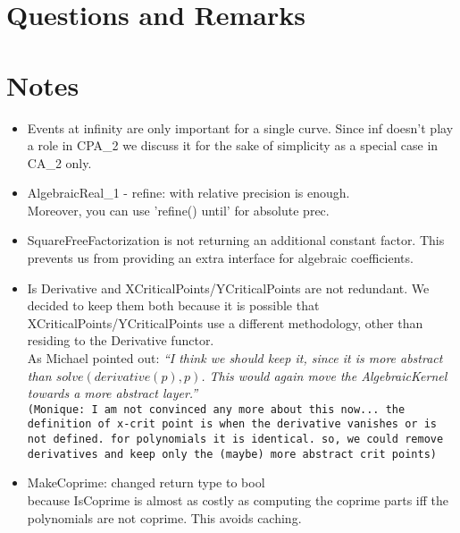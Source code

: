 
\section{Questions and Remarks}

\section{Notes}
\begin{itemize}
 \item Events at infinity are only important for a single curve. Since
   inf doesn't play a role in CPA\_2 we discuss it for the sake of
   simplicity as a special case in CA\_2 only. 
\item AlgebraicReal\_1 - refine: with relative precision is enough. \\
      Moreover, you can use 'refine() until' for absolute prec.
\item SquareFreeFactorization is not returning an additional constant 
      factor. This prevents us from providing an extra interface for 
      algebraic coefficients.
\item Is Derivative and XCriticalPoints/YCriticalPoints are not
   redundant. We decided to keep them both because it is possible that
   XCriticalPoints/YCriticalPoints use a different methodology, other
   than residing to the Derivative functor.\\ As Michael pointed out:
   \emph{``I think we should keep it, since it is more abstract than
     $solve(derivative(p),p)$.  This would again move the {\em
       AlgebraicKernel} towards a more abstract layer.''}\\
\texttt{(Monique: I am not convinced any more about this now... the 
definition of x-crit point is when the derivative vanishes or is not
defined. for polynomials it is identical. so, we could remove
derivatives and keep only the (maybe) more abstract crit points)}
\item MakeCoprime: changed return type to bool\\
      because IsCoprime is almost as costly as computing the coprime
      parts iff the polynomials are not coprime. This avoids caching.
\end{itemize}

